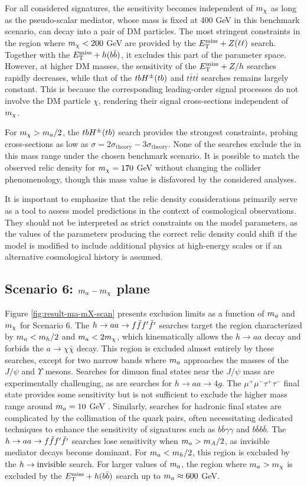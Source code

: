 For all considered signatures, the sensitivity becomes independent of $m_{\chi}$ as long as the pseudo-scalar mediator, whose mass is fixed at 400 GeV in this benchmark scenario, can decay into a pair of DM particles. The most stringent constraints in the region where $m_{\chi}<200$ GeV are provided by the $E_{\mathrm{T}}^{\mathrm{miss}}+Z(\ell\ell)$ search. Together with the $E_{\mathrm{T}}^{\mathrm{miss}}+h(b\bar{b})$, it excludes this part of the parameter space. However, at higher DM masses, the sensitivity of the $E_{\mathrm{T}}^{\mathrm{miss}}+Z/h$ searches rapidly decreases, while that of the $tbH^{\pm}(tb)$ and $t\bar{t}t\bar{t}$ searches remains largely constant. This is because the corresponding leading-order signal processes do not involve the DM particle $\chi$, rendering their signal cross-sections independent of $m_{\chi}$. 

For $m_{\chi}>m_a/2$, the $tbH^{\pm}(tb)$ search provides the strongest constraints, probing cross-sections as low as $\sigma =2\sigma_{\mathrm{theory}} - 3\sigma_{\mathrm{theory}}$. None of the searches exclude the \thdma in this mass range under the chosen benchmark scenario. It is possible to match the observed relic density for $m_{\chi}=170$ GeV without changing the collider phenomenology, though this mass value is disfavored by the considered analyses. 

It is important to emphasize that the relic density considerations primarily serve as a tool to assess \thdma model predictions in the context of cosmological observations. They should not be interpreted as strict constraints on the model parameters, as the values of the parameters producing the correct relic density could shift if the model is modified to include additional physics at high-energy scales or if an alternative cosmological history is assumed.

\subsection{Scenario 6: \texorpdfstring{$m_a -m_{\chi}$}{TEXT} plane}

Figure \ref{fig:result-ma-mX-scan} presents exclusion limits as a function of $m_a$ and $m_{\chi}$ for Scenario 6. The $h\rightarrow aa \rightarrow f\bar{f} f'\bar{f'}$ searches target the region characterized by $m_a<m_h/2$ and $m_a < 2m_{\chi}$, which kinematically allows the $h\rightarrow aa$ decay and forbids the $a\rightarrow \chi\bar{\chi}$ decay. This region is excluded almost entirely by these searches, except for two narrow bands where $m_a$ approaches the masses of the $J/\psi$ and $\Upsilon$ mesons. Searches for dimuon final states near the $J/\psi$ mass are experimentally challenging, as are searches for $h\rightarrow aa\rightarrow 4g$. The $\mu^+\mu^-\tau^+\tau^-$ final state provides some sensitivity but is not sufficient to exclude the higher mass range around $m_a=10$ GeV \cite{HIGG-2014-02}. Similarly, searches for hadronic final states are complicated by the collimation of the quark pairs, often necessitating dedicated techniques to enhance the sensitivity of signatures such as $b\bar{b}\gamma\gamma$ and $b\bar{b}b\bar{b}$. The $h\rightarrow aa \rightarrow f\bar{f} f'\bar{f'}$ searches lose sensitivity when $m_a>m_A/2$, as invisible mediator decays become dominant. For $m_a < m_h/2$, this region is excluded by the $h\rightarrow \mathrm{invisible}$ search. For larger values of $m_a$, the region where $m_a>m_{\chi}$ is excluded by the $E_{\mathrm{T}}^{\mathrm{miss}}+h(b\bar{b})$  search up to $m_a\approx 600$ GeV. 


